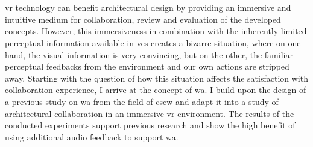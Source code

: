 \chapter{\abstractname}

\gls{vr} technology can benefit architectural design by providing an immersive and intuitive medium for collaboration, review and evaluation of the developed concepts. However, this immersiveness in combination with the inherently limited perceptual information available in \glspl{ve} creates a bizarre situation, where on one hand, the visual information is very convincing, but on the other, the familiar perceptual feedbacks from the environment and our own actions are stripped away.
Starting with the question of how this situation affects the satisfaction with collaboration experience, I arrive at the concept of \gls{wa}. I build upon the design of a previous study on \gls{wa} from the field of \gls{cscw} and adapt it into a study of architectural collaboration in an immersive \gls{vr} environment. 
The results of the conducted experiments support previous research and show the high benefit of using additional audio feedback to support \gls{wa}.


